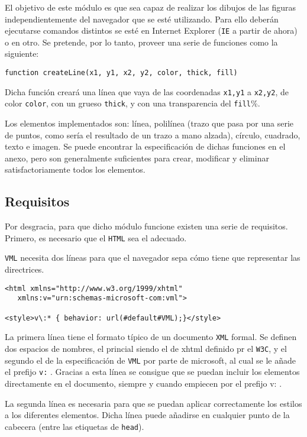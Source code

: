 El objetivo de este módulo es que sea capaz de realizar los dibujos de las figuras independientemente del navegador que se esté utilizando. Para ello deberán ejecutarse comandos distintos se esté en Internet Explorer (\texttt{IE} a partir de ahora) o en otro. Se pretende, por lo tanto, proveer una serie de funciones como la siguiente:

\begin{verbatim}
function createLine(x1, y1, x2, y2, color, thick, fill)
\end{verbatim}

Dicha función creará una línea que vaya de las coordenadas \texttt{x1,y1} a \texttt{x2,y2}, de color \texttt{color}, con un grueso \texttt{thick}, y con una transparencia del \texttt{fill}\%.

Los elementos implementados son: línea, polilínea (trazo que pasa por una serie de puntos, como sería el resultado de un trazo a mano alzada), círculo, cuadrado, texto e imagen. Se puede encontrar la especificación de dichas funciones en el anexo, pero son generalmente suficientes para crear, modificar y eliminar satisfactoriamente todos los elementos.

\subsection{Requisitos}
Por desgracia, para que dicho módulo funcione existen una serie de requisitos. Primero, es necesario que el \texttt{HTML} sea el adecuado.

\texttt{VML} necesita dos líneas para que el navegador sepa cómo tiene que representar las directrices.
\begin{verbatim}
<html xmlns="http://www.w3.org/1999/xhtml" 
   xmlns:v="urn:schemas-microsoft-com:vml">

<style>v\:* { behavior: url(#default#VML);}</style>
\end{verbatim}

La primera línea tiene el formato típico de un documento \texttt{XML} formal. Se definen dos espacios de nombres, el princial siendo el de xhtml definido pr el \texttt{W3C}, y el segundo el de la especificación de \texttt{VML} por parte de microsoft, al cual se le añade el prefijo \texttt{v:} . Gracias a esta línea se consigue que se puedan incluir los elementos directamente en el documento, siempre y cuando empiecen por el prefijo v: .

La segunda línea es necesaria para que se puedan aplicar correctamente los estilos a los diferentes elementos. Dicha línea puede añadirse en cualquier punto de la cabecera (entre las etiquetas de \texttt{head}).

